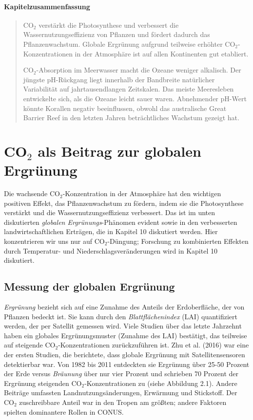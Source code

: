 \documentclass[12pt,paper=a4,DIV=12,parskip=never,chapterprefix=false,headings=standardclasses]{scrreprt}
\numberwithin{figure}{chapter}
\begin{document}
\paragraph{Kapitelzusammenfassung}
\begin{quote}
CO$_2$ verstärkt die Photosynthese und verbessert die Wassernutzungseffizienz von Pflanzen und fördert dadurch das Pflanzenwachstum. Globale Ergrünung aufgrund teilweise erhöhter CO$_2$-Konzentrationen in der Atmosphäre ist auf allen Kontinenten gut etabliert.

CO$_2$-Absorption im Meerwasser macht die Ozeane weniger alkalisch. Der jüngste pH-Rückgang liegt innerhalb der Bandbreite natürlicher Variabilität auf jahrtausendlangen Zeitskalen. Das meiste Meeresleben entwickelte sich, als die Ozeane leicht sauer waren. Abnehmender pH-Wert könnte Korallen negativ beeinflussen, obwohl das australische Great Barrier Reef in den letzten Jahren beträchtliches Wachstum gezeigt hat.
\end{quote}

\section{CO$_2$ als Beitrag zur globalen Ergrünung}

Die wachsende CO$_2$-Konzentration in der Atmosphäre hat den wichtigen positiven Effekt, das Pflanzenwachstum zu fördern, indem sie die Photosynthese verstärkt und die Wassernutzungseffizienz verbessert. Das ist im unten diskutierten \emph{globalen Ergrünungs}-Phänomen evident sowie in den verbesserten landwirtschaftlichen Erträgen, die in Kapitel 10 diskutiert werden. Hier konzentrieren wir uns nur auf CO$_2$-Düngung; Forschung zu kombinierten Effekten durch Temperatur- und Niederschlagsveränderungen wird in Kapitel 10 diskutiert.

\subsection{Messung der globalen Ergrünung}

\emph{Ergrünung} bezieht sich auf eine Zunahme des Anteils der Erdoberfläche, der von Pflanzen bedeckt ist. Sie kann durch den \emph{Blattflächenindex} (LAI) quantifiziert werden, der per Satellit gemessen wird. Viele Studien über das letzte Jahrzehnt haben ein globales Ergrünungsmuster (Zunahme des LAI) bestätigt, das teilweise auf steigende CO$_2$-Konzentrationen zurückzuführen ist. Zhu et al. (2016) war eine der ersten Studien, die berichtete, dass globale Ergrünung mit Satellitensensoren detektierbar war. Von 1982 bis 2011 entdeckten sie Ergrünung über 25-50 Prozent der Erde versus \emph{Bräunung} über nur vier Prozent und schrieben 70 Prozent der Ergrünung steigenden CO$_2$-Konzentrationen zu (siehe Abbildung 2.1). Andere Beiträge umfassten Landnutzungsänderungen, Erwärmung und Stickstoff. Der CO$_2$ zuschreibbare Anteil war in den Tropen am größten; andere Faktoren spielten dominantere Rollen in CONUS.
\end{document}
